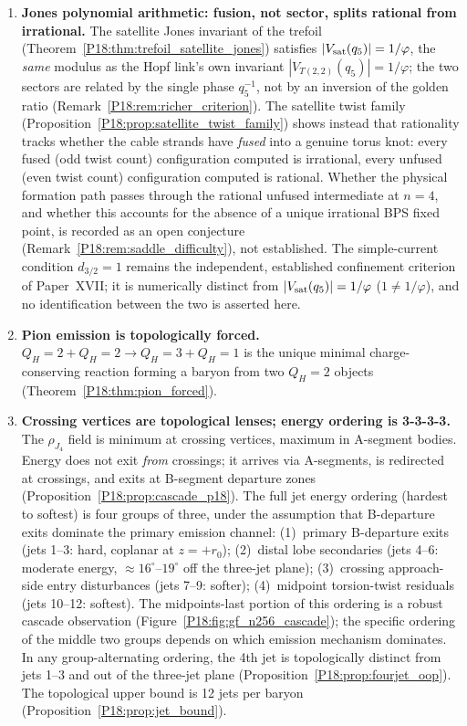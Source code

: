 \documentclass[11pt,a4paper]{article}
\theoremstyle{definition}\newtheorem{definition}[theorem]{Definition}
\theoremstyle{remark}
\newcommand{\vp}{\varphi}
\newcommand{\QH}{Q_H}
\newcommand{\dimq}[1]{d_{#1}}
\newcommand{\Jones}{V}
\begin{document}
\begin{enumerate}[noitemsep]
\item \textbf{Jones polynomial arithmetic: fusion, not sector, splits
  rational from irrational.}
The satellite Jones invariant of the trefoil
(Theorem~\ref{P18:thm:trefoil_satellite_jones}) satisfies
$|\Jones_{\rm sat}(q_5)|=1/\vp$, the \emph{same} modulus as the Hopf
link's own invariant $|\Jones_{T(2,2)}(q_5)|=1/\vp$; the two sectors
are related by the single phase $q_5^{-1}$, not by an inversion of
the golden ratio (Remark~\ref{P18:rem:richer_criterion}).  The
satellite twist family (Proposition~\ref{P18:prop:satellite_twist_family})
shows instead that rationality tracks whether the cable strands have
\emph{fused} into a genuine torus knot: every fused (odd twist count)
configuration computed is irrational, every unfused (even twist
count) configuration computed is rational.  Whether the physical
formation path passes through the rational unfused intermediate at
$n=4$, and whether this accounts for the absence of a unique
irrational BPS fixed point, is recorded as an open conjecture
(Remark~\ref{P18:rem:saddle_difficulty}), not established.
The simple-current condition $\dimq{3/2}=1$ remains the independent,
established confinement criterion of Paper~XVII; it is numerically
distinct from $|\Jones_{\rm sat}(q_5)|=1/\vp$ ($1\ne1/\vp$), and no
identification between the two is asserted here.

\item \textbf{Pion emission is topologically forced.}
$\QH=2+\QH=2\to\QH=3+\QH=1$ is the unique minimal charge-conserving
reaction forming a baryon from two $\QH=2$ objects
(Theorem~\ref{P18:thm:pion_forced}).

\item \textbf{Crossing vertices are topological lenses; energy ordering
  is 3-3-3-3.}
The $\rho_{J_4}$ field is minimum at crossing vertices, maximum
in A-segment bodies.  Energy does not exit \emph{from} crossings;
it arrives via A-segments, is redirected at crossings, and exits
at B-segment departure zones (Proposition~\ref{P18:prop:cascade_p18}).
The full jet energy ordering (hardest to softest) is
four groups of three, under the assumption that B-departure exits
dominate the primary emission channel:
(1)~primary B-departure exits (jets 1--3: hard, coplanar at $z=+r_0$);
(2)~distal lobe secondaries (jets 4--6: moderate energy,
$\approx16^\circ$--$19^\circ$ off the three-jet plane);
(3)~crossing approach-side entry disturbances (jets 7--9: softer);
(4)~midpoint torsion-twist residuals (jets 10--12: softest).
The midpoints-last portion of this ordering is a robust cascade
observation (Figure~\ref{P18:fig:gf_n256_cascade}); the specific
ordering of the middle two groups depends on which emission
mechanism dominates.  In any group-alternating ordering, the 4th
jet is topologically distinct from jets 1--3 and out of the
three-jet plane (Proposition~\ref{P18:prop:fourjet_oop}).
The topological upper bound is 12 jets per baryon
(Proposition~\ref{P18:prop:jet_bound}).


\end{enumerate}
\end{document}
